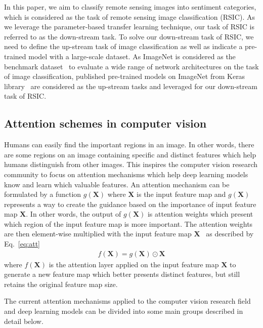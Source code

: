 \documentclass[sigconf]{acmart}
\begin{document}
In this paper, we aim to classify remote sensing images into sentiment categories, which is considered as the task of remote sensing image classification (RSIC).
As we leverage the parameter-based transfer learning technique, our task of RSIC is referred to as the down-stream task.
To solve our down-stream task of RSIC, we need to define the up-stream task of image classification as well as indicate a pre-trained model with a large-scale dataset.
As ImageNet is considered as the benchmark dataset~\cite{Imagenet} to evaluate a wide range of network architectures on the task of image classification, published pre-trained models on ImageNet from Keras library~\cite{keras_app} are considered as the up-stream tasks and leveraged for our down-stream task of RSIC.
 

\subsection{Attention schemes in computer vision}
\label{attention}

Humans can easily find the important regions in an image.
In other words, there are some regions on an image containing specific and distinct features which help humans distinguish from other images. 
This inspires the computer vision research community to focus on attention mechanisms which help deep learning models know and learn which valuable features.  
An attention mechanism can be formulated by a function $g(\mathbf{X})$ where $\textbf{X}$ is the input feature map and $g(\mathbf{X})$ represents a way to create the guidance based on the importance of input feature map $\mathbf{X}$.
In other words, the output of $g(\mathbf{X})$ is attention weights which present which region of the input feature map is more important.
The attention weights are then element-wise multiplied with the input feature map $\textbf{X}$~\cite{hu2018squeeze, woo2018cbam} as described by Eq.~\ref{eq:att}
\begin{align}
   \label{eq:att}
   f(\mathbf{X}) = g(\mathbf{X}) \odot \mathbf{X}
\end{align}
where $f(\mathbf{X})$ is the attention layer applied on the input feature map $\mathbf{X}$ to generate a new feature map which better presents distinct features, but still retains the original feature map size.

The current attention mechanisms applied to the computer vision research field and deep learning models can be divided into some main groups described in detail below.
\end{document}
